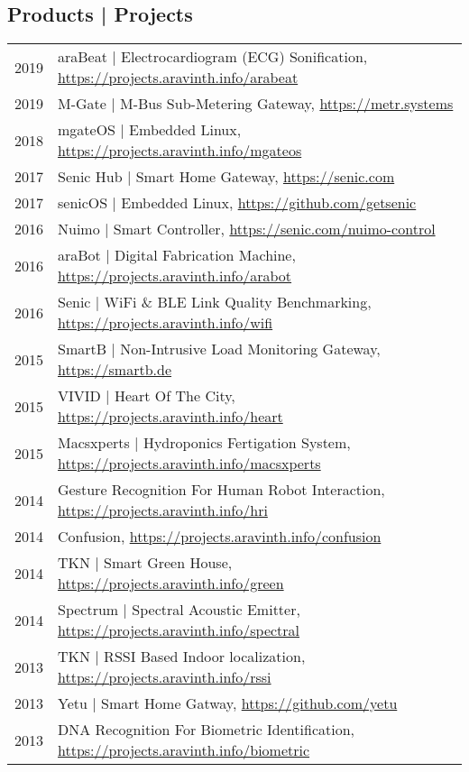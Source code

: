 \subsection{Products | Projects}
\begin{longtable}
	{r|p{13cm}}
	\textsc{2019} & araBeat | Electrocardiogram (ECG) Sonification, \href{https://projects.aravinth.info/arabeat}{https://projects.aravinth.info/arabeat}\\
	\textsc{2019} & M-Gate | M-Bus Sub-Metering Gateway, \href{https://metr.systems}{https://metr.systems}\\
	\textsc{2018} & mgateOS | Embedded Linux, \href{https://projects.aravinth.info/mgateos}{https://projects.aravinth.info/mgateos}\\
	\textsc{2017} & Senic Hub | Smart Home Gateway, \href{https://senic.com}{https://senic.com}\\
	\textsc{2017} & senicOS | Embedded Linux, \href{https://github.com/getsenic}{https://github.com/getsenic}\\
	\textsc{2016} & Nuimo | Smart Controller, \href{https://senic.com/nuimo-control}{https://senic.com/nuimo-control}\\
	\textsc{2016} & araBot | Digital Fabrication Machine, \href{https://projects.aravinth.info/arabot}{https://projects.aravinth.info/arabot}\\
	\textsc{2016} & Senic | WiFi \& BLE Link Quality Benchmarking, \href{https://projects.aravinth.info/wifi}{https://projects.aravinth.info/wifi}\\
	\textsc{2015} & SmartB | Non-Intrusive Load Monitoring Gateway, \href{https://smartb.de}{https://smartb.de}\\
	\textsc{2015} & VIVID | Heart Of The City, \href{https://projects.aravinth.info/heart}{https://projects.aravinth.info/heart}\\
	\textsc{2015} & Macsxperts | Hydroponics Fertigation System, \href{https://projects.aravinth.info/macsxperts}{https://projects.aravinth.info/macsxperts}\\
	\textsc{2014} & Gesture Recognition For Human Robot Interaction, \href{https://projects.aravinth.info/hri}{https://projects.aravinth.info/hri}\\
	\textsc{2014} & Confusion, \href{https://projects.aravinth.info/confusion}{https://projects.aravinth.info/confusion}\\
	\textsc{2014} & TKN | Smart Green House, \href{https://projects.aravinth.info/green}{https://projects.aravinth.info/green}\\
	\textsc{2014} & Spectrum | Spectral Acoustic Emitter, \href{https://projects.aravinth.info/spectral}{https://projects.aravinth.info/spectral}\\
	\textsc{2013} & TKN | RSSI Based Indoor localization, \href{https://projects.aravinth.info/rssi}{https://projects.aravinth.info/rssi}\\
	\textsc{2013} & Yetu | Smart Home Gatway, \href{https://github.com/yetu}{https://github.com/yetu}\\
	\textsc{2013} & DNA Recognition For Biometric Identification, \href{https://projects.aravinth.info/biometric}{https://projects.aravinth.info/biometric}\\


\end{longtable}
